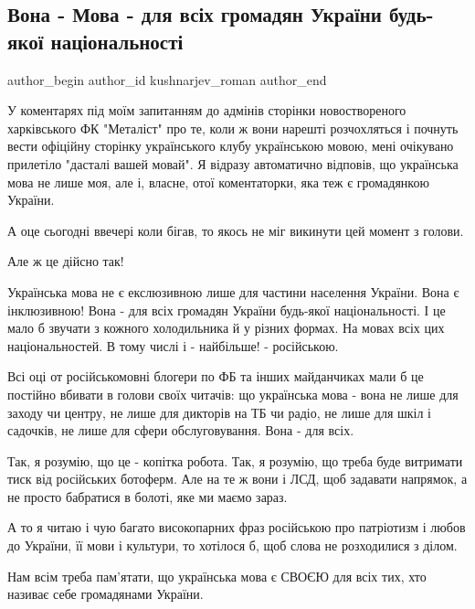  
 
 
 
 
 
\subsection{Вона - Мова - для всіх громадян України будь-якої національності}
\label{sec:06_08_2021.fb.kushnarjev_roman.1.mova}
 
\ifcmt
 author_begin
   author_id kushnarjev_roman
 author_end
\fi

У коментарях під моїм запитанням до адмінів сторінки новоствореного
харківського ФК "Металіст" про те, коли ж вони нарешті розчохляться і почнуть
вести офіційну сторінку українського клубу українською мовою, мені очікувано
прилетіло "дасталі вашей мовай". Я відразу автоматично відповів, що українська
мова не лише моя, але і, власне, отої коментаторки, яка теж є громадянкою
України.

А оце сьогодні ввечері коли бігав, то якось не міг викинути цей момент з
голови.

Але ж це дійсно так!

Українська мова не є екслюзивною лише для частини населення України. Вона є
інклюзивною! Вона - для всіх громадян України будь-якої національності. І це
мало б звучати з кожного холодильника й у різних формах. На мовах всіх цих
національностей. В тому числі і - найбільше! - російською. 

Всі оці от російськомовні блогери по ФБ та інших майданчиках мали б це постійно
вбивати в голови своїх читачів: що українська мова - вона не лише для заходу чи
центру, не лише для дикторів на ТБ чи радіо, не лише для шкіл і садочків, не
лише для сфери обслуговування. Вона - для всіх.

Так, я розумію, що це - копітка робота. Так, я розумію, що треба буде витримати
тиск від російських ботоферм. Але на те ж вони і ЛСД, щоб задавати напрямок, а
не просто бабратися в болоті, яке ми маємо зараз.

А то я читаю і чую багато високопарних фраз російською про патріотизм і любов
до України, її мови і культури, то хотілося б, щоб слова не розходилися з
ділом.

Нам всім треба пам'ятати, що українська мова є СВОЄЮ для всіх тих, хто називає
себе громадянами України.

